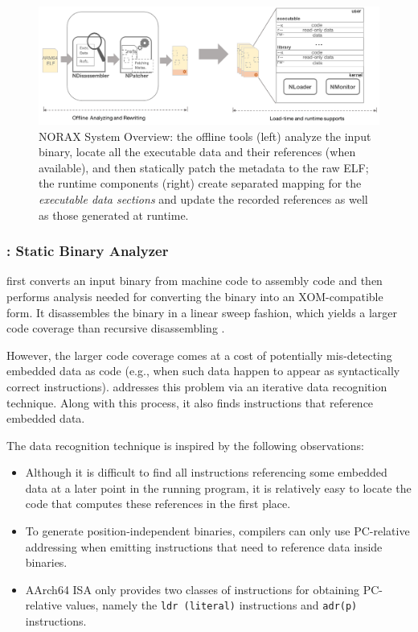 \begin{figure}[t]
\begin{center}
\includegraphics[scale=0.60]{norax/figures/overview}
\caption{NORAX System Overview: the offline tools (left) analyze the input binary, locate all the executable data and their references (when available), and then statically patch the metadata to the raw ELF; the runtime components (right) create separated mapping for the \emph{executable data sections} and update the recorded references as well as those generated at runtime.}
\label{fig:overview}
\end{center}
\end{figure}


\subsubsection{\NDisassembler: Static Binary Analyzer}
\NDisassembler first converts an input binary from machine code to assembly code and then performs analysis needed for converting the binary into an XOM-compatible form. 
It disassembles the binary in a linear sweep fashion, which yields a larger code coverage than recursive disassembling \cite{linearsweep}. 

However, the larger code coverage comes at a 
cost of potentially mis-detecting embedded data as code (e.g., when such data happen to appear as syntactically correct instructions).
 \NDisassembler addresses this problem via an iterative data recognition technique. Along with this process, it also finds instructions that reference embedded data. 

The data recognition technique is inspired by the following observations:
\begin{itemize}
	\item Although it is difficult to find all instructions referencing some embedded data at a later point in the running program, it is relatively easy to locate the code that computes these references in the first place.
	\item To generate position-independent binaries, compilers can only use PC-relative addressing when emitting instructions that need to reference data inside binaries.
	\item AArch64 ISA only provides two classes of instructions for obtaining PC-relative values, namely the {\tt ldr (literal)} instructions and {\tt adr(p)} instructions.
\end{itemize}

